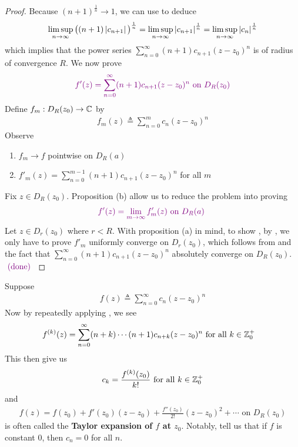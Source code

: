 \documentclass{report}
\begin{document}
\begin{proof}
Because $(n+1)^{\frac{1}{n}}\to 1$, we can use  to deduce 
\begin{align*}
  \limsup_{n\to\infty} \big( (n+1)\left|c_{n+1}\right| \big)^{\frac{1}{n}}=\limsup_{n\to\infty}  \left|c_{n+1}\right|^{\frac{1}{n}}=\limsup_{n\to\infty} \left|c_n\right|^{\frac{1}{n}} 
\end{align*}
which implies that the power series $\sum_{n=0}^{\infty} (n+1)c_{n+1}(z-z_0)^n$ is of radius of convergence $R$. We now prove 
\begin{align*}
\textcolor{violet}{f'(z)=\sum_{n=0}^{\infty}(n+1)c_{n+1}(z-z_0)^n\text{ on }D_R(z_0)}
\end{align*}
Define $f_m:D_R(z_0)\rightarrow \mathbb{C}$ by
 \begin{align*}
f_m(z)\triangleq \sum_{n=0}^{m} c_n(z-z_0)^n
\end{align*}
Observe 
\begin{enumerate}[label=(\alph*)]
  \item $f_m\to f$ pointwise on $D_R(a)$ 
  \item $f'_m(z)=\sum_{n=0}^{m-1}(n+1)c_{n+1}(z-z_0)^n$ for all $m$
\end{enumerate}
Fix $z\in D_R(z_0)$. Proposition (b) allow us to reduce the problem into proving
\begin{align}
\label{an1}
  \textcolor{violet}{f'(z)=\lim_{m\to \infty}f'_m(z)\text{ on $D_R(a)$ }}
\end{align}
Let $z\in D_r(z_0)$ where $r<R$. With proposition (a) in mind, to show , by , we only have to prove $f'_m$ uniformly converge on $D_r(z_0)$, which follows from  and the fact that $\sum_{n=0}^{\infty}(n+1)c_{n+1}(z-z_0)^n$ absolutely converge on $D_R(z_0)$. $\textcolor{violet}{\text{ (done) }}$ 
\end{proof}
\begin{mdframed}
Suppose 
\begin{align*}
f(z)\triangleq \sum _{n=0}^{\infty}c_n(z-z_0)^n 
\end{align*}
Now by repeatedly applying , we see 
\begin{align}
\label{fkz}
f^{(k)}(z)&=\sum_{n=0}^{\infty} (n+k) \cdots (n+1)c_{n+k}(z-z_0)^n\text{ for all }k\in\mathbb{Z}_0^+
\end{align}
This then give us 
\begin{align}
\label{ckf}
c_k =\frac{f^{(k)}(z_0)}{k!}\text{ for all }k \in\mathbb{Z}_0^+ 
\end{align}
and 
\begin{align}
\label{Taylor expansion}
f(z)=f(z_0)+  f'(z_0)(z-z_0)+ \frac{f''(z_0)}{2!}(z-z_0)^2+\cdots \text{ on }D_R(z_0) 
\end{align}
 is often called the \textbf{Taylor expansion of $f$ at $z_0$}. Notably,  tell us that if $f$ is constant  $0$, then $c_n=0$ for all  $n$. 
\end{mdframed}
\end{document}

